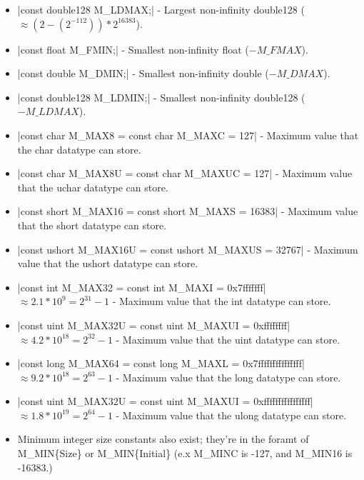 \documentclass[12pt, letterpaper, oneside]{article}
\begin{document}
\begin{itemize}
		\item[--] \spverb|const double128 M_LDMAX;| - Largest non-infinity double128 
		($\approx (2-(2^{-112}))*2^{16383}$).
		\item[--] \spverb|const float M_FMIN;| - Smallest non-infinity float ($-M\_FMAX$).
		\item[--] \spverb|const double M_DMIN;| - Smallest non-infinity double ($-M\_DMAX$).
		\item[--] \spverb|const double128 M_LDMIN;| - Smallest non-infinity double128 
		($-M\_LDMAX$).
		\item[--] \spverb|const char M_MAX8 = const char M_MAXC = 127| - Maximum value that the char datatype can store.

		\item[--] \spverb|const char M_MAX8U = const char M_MAXUC = 127| - Maximum value that the uchar datatype can store.		
		\newline
		\item[--] \spverb|const short M_MAX16 = const short M_MAXS = 16383| - Maximum value that the short datatype can store.
		\item[--] \spverb|const ushort M_MAX16U = const ushort M_MAXUS = 32767| - Maximum value that the ushort datatype can store.
		\newline
		\item[--] \spverb|const int M_MAX32 = const int M_MAXI = 0x7fffffff| $\approx 2.1*10^9 = 2^{31}-1$ - Maximum value that the int datatype can store.
		\item[--] \spverb|const uint M_MAX32U = const uint M_MAXUI = 0xffffffff| $\approx 4.2*10^18 = 2^{32}-1$ - Maximum value that the uint datatype can store.
		\newline
		\item[--] \spverb|const long M_MAX64 = const long M_MAXL = 0x7fffffffffffffff| $\approx 9.2*10^18 = 2^{63}-1$ - Maximum value that the long datatype can store.
		\item[--] \spverb|const uint M_MAX32U = const uint M_MAXUI = 0xffffffffffffffff| $\approx 1.8*10^19 = 2^{64}-1$ - Maximum value that the ulong datatype can store.
		\item[--] Minimum integer size constants also exist; they're in the foramt of M\_MIN\{Size\} or M\_MIN\{Initial\} (e.x M\_MINC is -127, and M\_MIN16 is -16383.)
		
	\end{itemize} 
\end{document}
